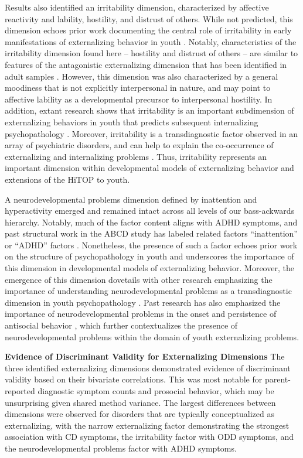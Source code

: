 \documentclass[
  20pt,
  number,
  preprint,
  3p,
  twocolumn]{elsarticle}
\begin{document}
Results also identified an irritability dimension, characterized by
affective reactivity and lability, hostility, and distrust of others.
While not predicted, this dimension echoes prior work documenting the
central role of irritability in early manifestations of externalizing
behavior in youth \citep{leibenluft2013}. Notably, characteristics of
the irritability dimension found here -- hostility and distrust of
others -- are similar to features of the antagonistic externalizing
dimension that has been identified in adult samples
\citep{mullins-sweatt2022}. However, this dimension was also
characterized by a general moodiness that is not explicitly
interpersonal in nature, and may point to affective lability as a
developmental precursor to interpersonal hostility. In addition, extant
research shows that irritability is an important subdimension of
externalizing behaviors in youth that predicts subsequent internalizing
psychopathology \citep[e.g.,][]{burke2012}. Moreover, irritability is a
transdiagnostic factor observed in an array of psychiatric disorders,
and can help to explain the co-occurrence of externalizing and
internalizing problems \citep{finlay-jones2023}. Thus, irritability
represents an important dimension within developmental models of
externalizing behavior and extensions of the HiTOP to youth.

A neurodevelopmental problems dimension defined by inattention and
hyperactivity emerged and remained intact across all levels of our
bass-ackwards hierarchy. Notably, much of the factor content aligns with
ADHD symptoms, and past structural work in the ABCD study has labeled
related factors ``inattention'' or ``ADHD'' factors
\citep[e.g.,][]{clark2023}. Nonetheless, the presence of such a factor
echoes prior work on the structure of psychopathology in youth
\citep{michelini2019, holmes2021} and underscores the importance of this
dimension in developmental models of externalizing behavior. Moreover,
the emergence of this dimension dovetails with other research
emphasizing the importance of understanding neurodevelopmental problems
as a transdiagnostic dimension in youth psychopathology
\citep{astle2022}. Past research has also emphasized the importance of
neurodevelopmental problems in the onset and persistence of antisocial
behavior \citep{goozen2022}, which further contextualizes the presence
of neurodevelopmental problems within the domain of youth externalizing
problems.

\textbf{Evidence of Discriminant Validity for Externalizing Dimensions}
The three identified externalizing dimensions demonstrated evidence of
discriminant validity based on their bivariate correlations. This was
most notable for parent-reported diagnostic symptom counts and prosocial
behavior, which may be unsurprising given shared method variance. The
largest differences between dimensions were observed for disorders that
are typically conceptualized as externalizing, with the narrow
externalizing factor demonstrating the strongest association with CD
symptoms, the irritability factor with ODD symptoms, and the
neurodevelopmental problems factor with ADHD symptoms.
\end{document}
